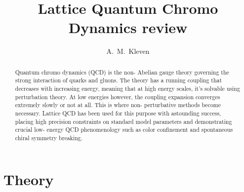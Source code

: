 \documentclass[a4paper,10pt]{article}
\author{A.\ M.\ Kleven}
\title{Lattice Quantum Chromo Dynamics review}
\begin{document}
\maketitle
\begin{abstract}
Quantum chromo dynamics (QCD) is the non- Abelian gauge theory governing the strong interaction of quarks and gluons. The theory has a running coupling that decreases with increasing energy, meaning that at high energy scales, it's solvable using perturbation theory. At low energies however, the coupling expansion converges extremely slowly or not at all. This is where non- perturbative methods become necessary. Lattice QCD has been used for this purpose with astounding success, placing high precision constraints on standard model parameters and demonstrating crucial low- energy QCD phenomenology such as color confinement and spontaneous chiral symmetry breaking.
\end{abstract}
\vspace{5mm}






\section{Theory}

\newpage
\newpage
\end{document}
